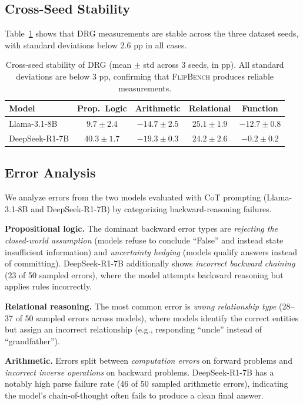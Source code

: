 \documentclass{article}
\newcommand{\flipbench}{\textsc{FlipBench}\xspace}
\begin{document}
\subsection{Cross-Seed Stability}

Table~\ref{tab:stability} shows that DRG measurements are stable across the three dataset seeds, with standard deviations below 2.6 pp in all cases.

\begin{table}[t]
\caption{Cross-seed stability of DRG (mean $\pm$ std across 3 seeds, in pp). All standard deviations are below 3 pp, confirming that \flipbench produces reliable measurements.}
\label{tab:stability}
\centering
\begin{tabular}{lcccc}
\toprule
Model & Prop.\ Logic & Arithmetic & Relational & Function \\
\midrule
Llama-3.1-8B & $9.7 \pm 2.4$ & $-14.7 \pm 2.5$ & $25.1 \pm 1.9$ & $-12.7 \pm 0.8$ \\
DeepSeek-R1-7B & $40.3 \pm 1.7$ & $-19.3 \pm 0.3$ & $24.2 \pm 2.6$ & $-0.2 \pm 0.2$ \\
\bottomrule
\end{tabular}
\end{table}

\subsection{Error Analysis}

We analyze errors from the two models evaluated with CoT prompting (Llama-3.1-8B and DeepSeek-R1-7B) by categorizing backward-reasoning failures.

\textbf{Propositional logic.} The dominant backward error types are \emph{rejecting the closed-world assumption} (models refuse to conclude ``False'' and instead state insufficient information) and \emph{uncertainty hedging} (models qualify answers instead of committing). DeepSeek-R1-7B additionally shows \emph{incorrect backward chaining} (23 of 50 sampled errors), where the model attempts backward reasoning but applies rules incorrectly.

\textbf{Relational reasoning.} The most common error is \emph{wrong relationship type} (28--37 of 50 sampled errors across models), where models identify the correct entities but assign an incorrect relationship (e.g., responding ``uncle'' instead of ``grandfather'').

\textbf{Arithmetic.} Errors split between \emph{computation errors} on forward problems and \emph{incorrect inverse operations} on backward problems. DeepSeek-R1-7B has a notably high parse failure rate (46 of 50 sampled arithmetic errors), indicating the model's chain-of-thought often fails to produce a clean final answer.
\end{document}
